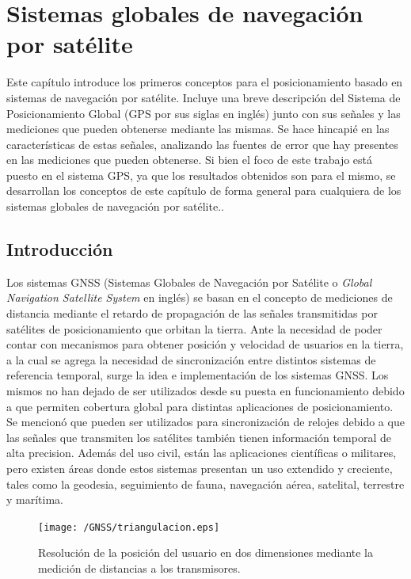 \documentclass[a4paper,12pt,oneside,onecolumn,final,openright]{book}%
\begin{document}
\chapter{Sistemas globales de navegación por satélite}\label{ch:GNSS}
	Este capítulo introduce los primeros conceptos para el posicionamiento basado en sistemas de navegación por satélite. Incluye una breve descripción del Sistema de Posicionamiento Global (GPS por sus siglas en inglés) junto con sus señales y las mediciones que pueden obtenerse mediante las mismas. Se hace hincapié en las características de estas señales, analizando las fuentes de error que hay presentes en las mediciones que pueden obtenerse. Si bien el foco de este trabajo está puesto en el sistema GPS, ya que los resultados obtenidos son para el mismo, se desarrollan los conceptos de este capítulo de forma general para cualquiera de los sistemas globales de navegación por satélite..
	
\section{Introducción}
	Los sistemas GNSS (Sistemas Globales de Navegación por Satélite o \textit{Global Navigation Satellite System} en inglés) se basan en el concepto de mediciones de distancia mediante el retardo de propagación de las señales transmitidas por satélites de posicionamiento que orbitan la tierra. Ante la necesidad de poder contar con mecanismos para obtener posición y velocidad de usuarios en la tierra, a la cual se agrega la necesidad de sincronización entre distintos sistemas de referencia temporal, surge la idea e implementación de los sistemas GNSS. Los mismos no han dejado de ser utilizados desde su puesta en funcionamiento debido a que permiten cobertura global para distintas aplicaciones de posicionamiento. Se mencionó que pueden ser utilizados para sincronización de relojes debido a que las señales que transmiten los satélites también tienen información temporal de alta precision. Además del uso civil, están las aplicaciones científicas o militares, pero existen áreas donde estos sistemas presentan un uso extendido y creciente, tales como la geodesia, seguimiento de fauna, navegación aérea, satelital, terrestre y marítima.
	
\begin{figure}%
    \centering
    \texttt{[image: /GNSS/triangulacion.eps]}
    \caption{Resolución de la posición del usuario en dos dimensiones mediante la medición de distancias a los transmisores.}
    \label{fig:triangulacion}
\end{figure}	
	
\end{document}
